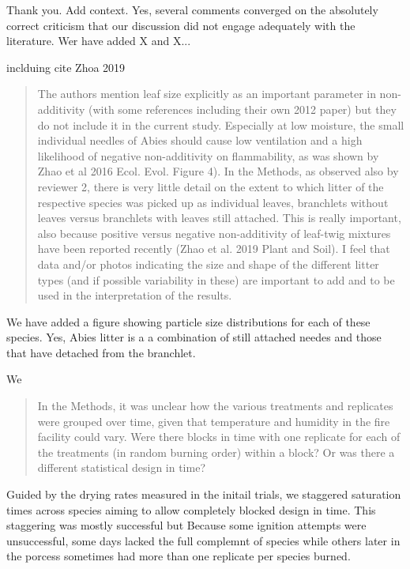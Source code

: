 \documentclass[letterpaper, 12pt]{letter}
\begin{document}
\begin{letter}{}
Thank you. Add context. Yes, several comments converged on the absolutely correct criticism that our discussion did not engage adequately with the literature.  Wer have added X and X...

inclduing cite Zhoa 2019

\begin{quote}
The authors mention leaf size explicitly as an important parameter in non-additivity (with some references including their own 2012 paper) but they do not include it in the current study. Especially at low moisture, the small individual needles of Abies should cause low ventilation and a high likelihood of negative non-additivity on flammability, as was shown by Zhao et al 2016 Ecol. Evol. Figure 4). In the Methods, as observed also by reviewer 2, there is very little detail on the extent to which litter of the respective species was picked up as individual leaves, branchlets without leaves versus branchlets with leaves still attached. This is really important, also because positive versus negative non-additivity of leaf-twig mixtures have been reported recently (Zhao et al. 2019 Plant and Soil). I feel that data and/or photos indicating the size and shape of the different litter types (and if possible variability in these) are important to add and to be used in the interpretation of the results.
\end{quote}

We have added a figure showing particle size distributions for each of these species. Yes, Abies litter is a a combination of still attached needes and those that have detached from the branchlet.

We 

\begin{quote}
In the Methods, it was unclear how the various treatments and replicates were grouped over time, given that temperature and humidity in the fire facility could vary. Were there blocks in time with one replicate for each of the treatments (in random burning order) within a block? Or was there a different statistical design in time? 
\end{quote}

Guided by the drying rates measured in the initail trials, we staggered saturation times across species aiming to allow completely blocked design in time. This staggering was mostly successful but Because some ignition attempts were unsuccessful, some days lacked the full complemnt of species while others later in the porcess sometimes had more than one replicate per species burned.


\end{letter}
\end{document}
